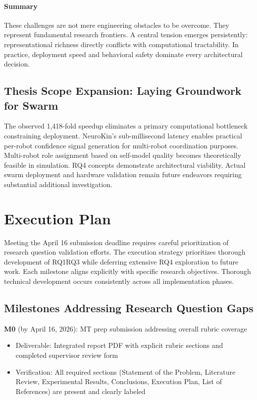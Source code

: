 ﻿\documentclass[11pt,a4paper]{article}
\begin{document}
\paragraph{Summary}

These challenges are not mere engineering obstacles to be overcome. They represent fundamental research frontiers. A central tension emerges persistently: representational richness directly conflicts with computational tractability. In practice, deployment speed and behavioral safety dominate every architectural decision.

\subsection{Thesis Scope Expansion: Laying Groundwork for Swarm}

The observed 1,418-fold speedup eliminates a primary computational bottleneck constraining deployment. NeuroKin's sub-millisecond latency enables practical per-robot confidence signal generation for multi-robot coordination purposes. Multi-robot role assignment based on self-model quality becomes theoretically feasible in simulation. RQ4 concepts demonstrate architectural viability. Actual swarm deployment and hardware validation remain future endeavors requiring substantial additional investigation.

\section{Execution Plan}

Meeting the April 16 submission deadline requires careful prioritization of research question validation efforts. The execution strategy prioritizes thorough development of RQ1\textendash RQ3 while deferring extensive RQ4 exploration to future work. Each milestone aligns explicitly with specific research objectives. Thorough technical development occurs consistently across all implementation phases.

\subsection{Milestones Addressing Research Question Gaps}

\textbf{M0} (by April 16, 2026): MT prep submission addressing overall rubric coverage
\begin{itemize}
  \item Deliverable: Integrated report PDF with explicit rubric sections and completed supervisor review form
  \item Verification: All required sections (Statement of the Problem, Literature Review, Experimental Results, Conclusions, Execution Plan, List of References) are present and clearly labeled
\end{itemize}
\end{document}
